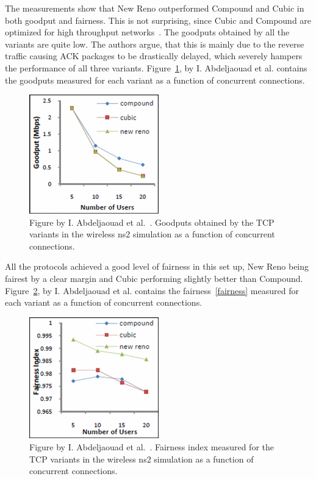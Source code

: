 The measurements show that New Reno outperformed Compound and Cubic in both goodput and fairness. This is not surprising, since Cubic and Compound are optimized for high throughput networks~\cite{Ha08,Tan05}. The goodputs obtained by all the variants are quite low. The authors argue, that this is mainly due to the reverse traffic causing ACK packages to be drastically delayed, which severely hampers the performance of all three variants. Figure~\ref{fig:goodput}, by I. Abdeljaouad et al. contains the goodputs measured for each variant as a function of concurrent connections.

\begin{figure}
	\includegraphics[width=0.5\textwidth]{images/abdeljaouad10_goodput.png}
	\caption{Figure by I. Abdeljaouad et al.~\cite{Abdeljaouad10}. Goodputs obtained by the TCP variants in the wireless ns2 simulation as a function of concurrent connections. }
	\label{fig:goodput}
\end{figure}

All the protocols achieved a good level of fairness in this set up, New Reno being fairest by a clear margin and Cubic performing slightly better than Compound. Figure~\ref{fig:fairness2}, by I. Abdeljaouad et al. contains the fairness~\eqref{fairness} measured for each variant as a function of concurrent connections.

\begin{figure}
	\includegraphics[width=0.5\textwidth]{images/abdeljaouad10_fairness_2.png}
	\caption{Figure by I. Abdeljaouad et al.~\cite{Abdeljaouad10}. Fairness index measured for the TCP variants in the wireless ns2 simulation as a function of concurrent connections.}
	\label{fig:fairness2}
\end{figure}